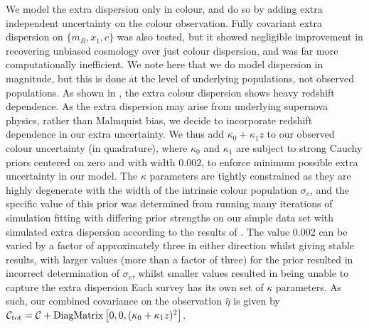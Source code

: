 \documentclass[a4paper,fleqn,usenatbib]{mnras}
\begin{document}
We model the extra dispersion only in colour, and do so by adding extra independent uncertainty on the colour observation. Fully covariant extra dispersion on $\lbrace m_B, x_1, c \rbrace$ was also tested, but it showed negligible improvement in recovering unbiased cosmology over just colour dispersion, and was far more computationally inefficient. We note here that we do model dispersion in magnitude, but this is done at the level of underlying populations, not observed populations. As shown in \citep{Kessler2013}, the extra colour dispersion shows heavy redshift dependence. As the extra dispersion may arise from underlying supernova physics, rather than Malmquist bias, we decide to incorporate redshift dependence in our extra uncertainty. We thus add $\kappa_0 + \kappa_1 z$ to our observed colour uncertainty (in quadrature), where $\kappa_0$ and $\kappa_1$ are subject to strong Cauchy priors centered on zero and with width $0.002$, to enforce minimum possible extra uncertainty in our model. The $\kappa$ parameters are tightly constrained as they are highly degenerate with the width of the intrinsic colour population $\sigma_c$, and the specific value of this prior was determined from running many iterations of simulation fitting with differing prior strengths on our simple data set with simulated extra dispersion according to the results of \citet{Kessler2013}. The value $0.002$ can be varied by a factor of approximately three in either direction whilst giving stable results, with larger values (more than a factor of three) for the prior resulted in incorrect determination of $\sigma_c$, whilst smaller values resulted in being unable to capture the extra dispersion  Each survey has its own set of $\kappa$ parameters. As such, our combined covariance on the observation $\hat{\eta}$ is given by $\mathcal{C}_{\rm tot} = \mathcal{C} + {\rm DiagMatrix}\left[0, 0, (\kappa_0 + \kappa_1 z)^2\right]$.
\end{document}
